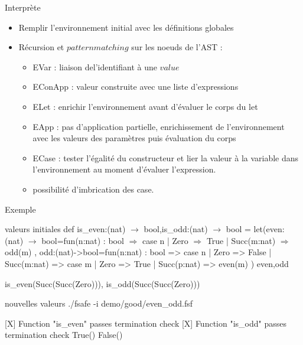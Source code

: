 \begin{frame}{Interprète}
  \begin{itemize}
  \item Remplir l'environnement initial avec les définitions globales
  \item Récursion et $pattern matching$ sur les noeuds de l'AST :
    \begin{itemize}
    \item EVar : liaison del'identifiant à une $value$
    \item EConApp : valeur construite avec une liste d'expressions
    \item ELet : enrichir l'environnement avant d'évaluer le corps du let
    \item EApp : pas d'application partielle, enrichissement de l'environnement avec les valeurs des paramètres puis évaluation du corps
    \item ECase : tester l'\'egalit\'e du constructeur et lier la valeur \`a la variable dans l'environnement au moment d'évaluer l'expression.
    \item possibilit\'e d'imbrication des case.
    \end{itemize}
  \end{itemize}
\end{frame}

\begin{frame}{Exemple}
  \begin{exampleblock}{valeurs initiales}
    def is\_even:(nat) $\rightarrow$ bool,is\_odd:(nat) $\rightarrow$ bool =
    let(even:(nat) $\rightarrow$ bool=fun(n:nat) : bool $\Rightarrow$
    case n {
      | Zero $\Rightarrow$ True
      | Succ(m:nat) $\Rightarrow$ odd(m)
    },
    odd:(nat)->bool=fun(n:nat) : bool =>
    case n {
      | Zero => False
      | Succ(m:nat) => case m {
        | Zero => True
        | Succ(p:nat) => even(m)}
    }) { even,odd }
    
    is\_even(Succ(Succ(Zero))),
    is\_odd(Succ(Succ(Zero)))
  \end{exampleblock}
  \begin{exampleblock}{nouvelles valeurs}
    ./fsafe -i demo/good/even\_odd.fsf 
    
    [X] Function "is\_even" passes termination check
    [X] Function "is\_odd" passes termination check
    True()
    False()
  \end{exampleblock}
\end{frame}
